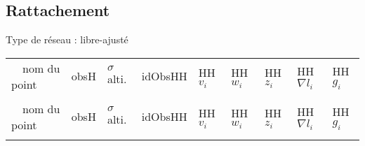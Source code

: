 \documentclass[a4paper, 9pt]{report}
\newenvironment{smalllongtable}{%
    \scriptsize %
    \ttfamily
    \begin{longtable}%
    }{
    \end{longtable}%
    }
\begin{document}
                                \subsection{Rattachement}
                                Type de réseau : libre-ajusté
                    
                                \begin{smalllongtable}{     
                                >{\raggedright}m{2.8cm}%
                                >{\raggedleft}m{1.4cm}%
                                >{\raggedleft}m{1.4cm}%
                                >{\raggedleft}m{1.4cm}%
                                >{\raggedleft}m{1.4cm}
                                >{\raggedleft}m{1.4cm}
                                >{\raggedleft}m{1.4cm}
                                >{\raggedleft}m{1.4cm}
                                >{\raggedleft\arraybackslash}m{1.4cm}}
                    
                        
                                    \rowcolors{white} ~~\normalfont nom du point & \normalfont obsH & \normalfont $\sigma$ alti. & \normalfont idObsHH & \normalfont HH $v_i$ & \normalfont HH $w_i$ & \normalfont HH $z_i$ & \normalfont HH $\nabla l_i$ & \normalfont HH $g_i$ \\
                                    \rowcolors{white} & \normalfont [m] & \normalfont [mm] & \normalfont [-] & \normalfont [mm] & \normalfont [-] & \normalfont [-] & \normalfont [mm] & \normalfont [mm] \\
                                    \hline
                                    \endfirsthead
                                    \rowcolors{white} ~~\normalfont nom du point & \normalfont obsH & \normalfont $\sigma$ alti. & \normalfont idObsHH & \normalfont HH $v_i$ & \normalfont HH $w_i$ & \normalfont HH $z_i$ & \normalfont HH $\nabla l_i$ & \normalfont HH $g_i$ \\
                                    \rowcolors{white} & \normalfont [m] & \normalfont [mm] & \normalfont [-] & \normalfont [mm] & \normalfont [-] & \normalfont [-] & \normalfont [mm] & \normalfont [mm] \\
                                    \hline
                                    \endhead
                        

\end{smalllongtable}
\end{document}
